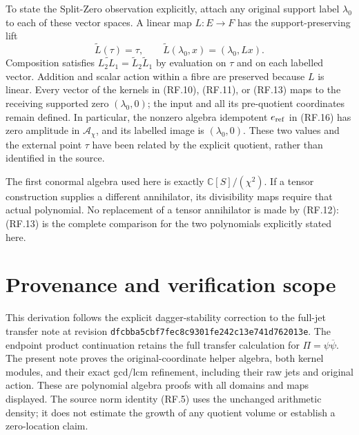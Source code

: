 \documentclass[11pt]{article}
\newcommand{\C}{\mathbb C}
\newcommand{\A}{\mathcal A}
\begin{document}
To state the Split-Zero observation explicitly, attach any original
support label $\lambda_0$ to each of these vector spaces. A linear
map $L:E\to F$ has the support-preserving lift
\[
 \widetilde L(\tau)=\tau,\qquad
 \widetilde L(\lambda_0,x)=(\lambda_0,Lx).
 \tag{RF.17}
\]
Composition satisfies $\widetilde{L_2L_1}
=\widetilde L_2\widetilde L_1$ by evaluation on $\tau$ and on
each labelled vector. Addition and scalar action within a fibre
are preserved because $L$ is linear. Every vector of the kernels
in (RF.10), (RF.11), or (RF.13) maps to the receiving supported
zero $(\lambda_0,0)$; the input and all its pre-quotient coordinates
remain defined. In particular, the nonzero algebra idempotent
$e_{\rm ref}$ in (RF.16) has zero amplitude in $\A_\chi$, and
its labelled image is $(\lambda_0,0)$. These two values and the
external point $\tau$ have been related by the explicit quotient,
rather than identified in the source.

The first conormal algebra used here is exactly $\C[S]/(\chi^2)$.
If a tensor construction supplies a different annihilator, its
divisibility maps require that actual polynomial. No replacement
of a tensor annihilator is made by (RF.12): (RF.13) is the complete
comparison for the two polynomials explicitly stated here.

\section{Provenance and verification scope}

This derivation follows the explicit dagger-stability correction
to the full-jet transfer note at revision
\texttt{dfcbba5cbf7fec8c9301fe242c13e741d762013e}.
The endpoint product continuation retains the full transfer
calculation for $\Pi=\psi\overline\psi$. The present note proves
the original-coordinate helper algebra, both kernel modules,
and their exact gcd/lcm refinement, including their raw jets and
original action. These are polynomial algebra proofs with all
domains and maps displayed. The source norm identity (RF.5)
uses the unchanged arithmetic density; it does not estimate the
growth of any quotient volume or establish a zero-location claim.
\end{document}
